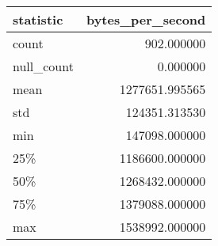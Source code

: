 \begin{tabular}{lr}
    \toprule
    statistic & bytes\_per\_second \\
    \midrule
    count & 902.000000 \\
    null\_count & 0.000000 \\
    mean & 1277651.995565 \\
    std & 124351.313530 \\
    min & 147098.000000 \\
    25\% & 1186600.000000 \\
    50\% & 1268432.000000 \\
    75\% & 1379088.000000 \\
    max & 1538992.000000 \\
    \bottomrule
\end{tabular}
